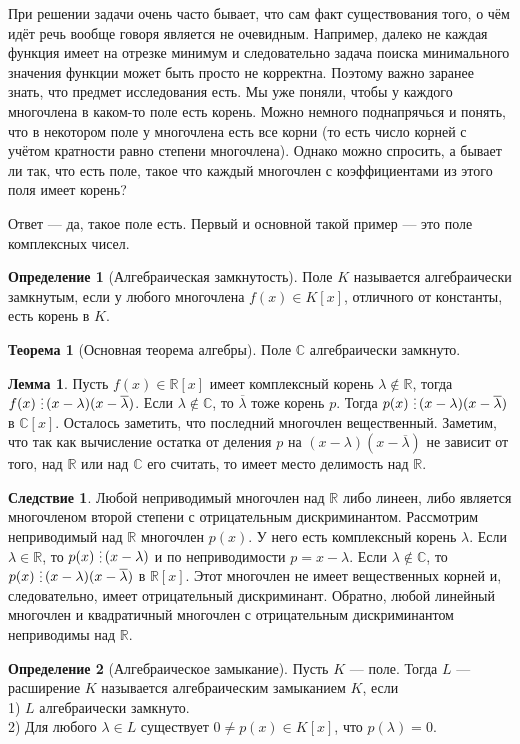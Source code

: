 \documentclass[10pt,a4paper,oneside]{book} %
\theoremstyle{definition}
\newtheorem*{defn}{Определение}
\newtheorem{thm}{Теорема}
\newtheorem{lem}{Лемма}
\newtheorem{cor}{Следствие}
\newcommand{\mb}[1]{\mathbb{#1}}
\newcommand{\ovl}{\overline}
\newcommand{\di}{\mathop{\,\scalebox{0.85}{\raisebox{-1.2pt}[0.5\height]{\vdots}}\,}}
\def\thrm{\begin{thm}}
\def\ethrm{\end{thm}}
\def\dfn{\begin{defn}}
\def\edfn{\end{defn}}
\def\lm{\begin{lem}}
\def\elm{\end{lem}}
\def\crl{\begin{cor}}
\def\ecrl{\end{cor}}
\begin{document}
При решении задачи очень часто бывает, что сам факт существования того, о чём идёт речь вообще говоря является не очевидным. Например, далеко не каждая функция имеет на отрезке минимум и следовательно задача поиска минимального значения функции может быть просто не корректна. Поэтому важно заранее знать, что предмет исследования есть. Мы уже поняли, чтобы у каждого многочлена в каком-то поле есть корень. Можно немного поднапрячься и понять, что в некотором поле у многочлена есть все корни (то есть число корней с учётом кратности равно степени многочлена). Однако можно спросить, а бывает ли так, что есть поле, такое что каждый многочлен с коэффициентами из этого поля имеет корень?

Ответ — да, такое поле есть. Первый и основной такой пример --- это поле комплексных чисел.
\dfn[Алгебраическая замкнутость] Поле $K$ называется алгебраически замкнутым, если у любого многочлена  $f(x)\in K[x]$, отличного от константы, есть корень в $K$.
\edfn

\thrm[Основная теорема алгебры] Поле $\mb C$ алгебраически замкнуто.
\ethrm

\lm Пусть $f(x)\in \mb R[x]$ имеет комплексный корень $\lambda \notin \mb R$, тогда $f(x)\di(x-\lambda)(x-\ovl{\lambda})$.
\proof Если $\lambda \notin \mb C$, то $\ovl{\lambda}$ тоже корень $p$. Тогда $p(x)\di(x-\lambda)(x-\ovl{\lambda})$ в $\mb C[x]$. Осталось заметить, что последний многочлен вещественный. Заметим, что так как вычисление остатка от деления $p$ на $(x-\lambda)(x-\ovl{\lambda})$ не зависит от того, над $\mb R$ или над $\mb C$ его считать, то имеет место делимость над $\mb R$.
\endproof
\elm

\crl Любой неприводимый многочлен над $\mb R$ либо линеен, либо является многочленом второй степени с отрицательным дискриминантом.
\proof Рассмотрим неприводимый над $\mb R$ многочлен $p(x)$. У него есть комплексный корень $\lambda$. Если $\lambda \in \mb R$, то $p(x)\di (x-\lambda)$ и по неприводимости $p=x-\lambda$.  Если $\lambda \notin \mb C$, то $p(x)\di (x-\lambda)(x-\ovl{\lambda})$ в $\mb R[x]$. Этот многочлен не имеет вещественных корней и, следовательно, имеет отрицательный дискриминант. Обратно, любой линейный многочлен и квадратичный многочлен с отрицательным дискриминантом неприводимы над $\mb R$.
\endproof
\ecrl

\dfn[Алгебраическое замыкание] Пусть $K$ --- поле. Тогда $L$ --- расширение $K$ называется алгебраическим замыканием $K$, если \\
1) $L$ алгебраически замкнуто.\\
2) Для любого $ \lambda \in L$ существует $0\neq p(x)\in K[x]$, что $p(\lambda)=0$.
\edfn
\end{document}
